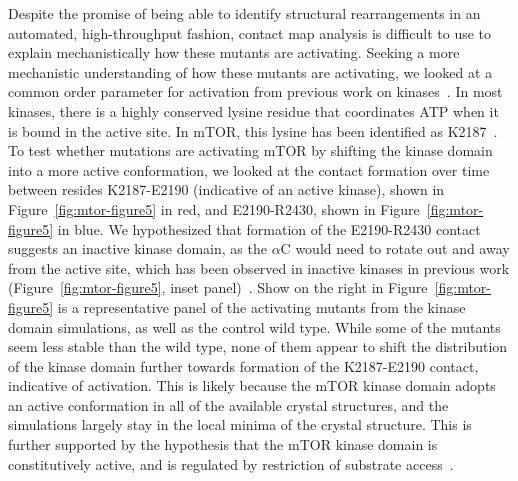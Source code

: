 \documentclass[phd,tocprelim]{cornell}
\begin{document}
Despite the promise of being able to identify structural rearrangements in an automated, high-throughput fashion, contact map analysis is difficult to use to explain mechanistically how these mutants are activating. Seeking a more mechanistic understanding of how these mutants are activating, we looked at a common order parameter for activation from previous work on kinases~\citep{Shukla:2014jp}. In most kinases, there is a highly conserved lysine residue that coordinates ATP when it is bound in the active site. In mTOR, this lysine has been identified as K2187~\citep{Yang:2013gaa}. To test whether mutations are activating mTOR by shifting the kinase domain into a more active conformation, we looked at the contact formation over time between resides K2187-E2190 (indicative of an active kinase), shown in Figure~\ref{fig:mtor-figure5} in red, and E2190-R2430, shown in Figure~\ref{fig:mtor-figure5} in blue. We hypothesized that formation of the E2190-R2430 contact suggests an inactive kinase domain, as the $\alpha$C would need to rotate out and away from the active site, which has been observed in inactive kinases in previous work (Figure~\ref{fig:mtor-figure5}, inset panel)~\citep{Shukla:2014jp,Jura:2011eh}. Show on the right in Figure~\ref{fig:mtor-figure5} is a representative panel of the activating mutants from the kinase domain simulations, as well as the control wild type. While some of the mutants seem less stable than the wild type, none of them appear to shift the distribution of the kinase domain further towards formation of the K2187-E2190 contact, indicative of activation. This is likely because the mTOR kinase domain adopts an active conformation in all of the available crystal structures, and the simulations largely stay in the local minima of the crystal structure. This is further supported by the hypothesis that the mTOR kinase domain is constitutively active, and is regulated by restriction of substrate access~\citep{Yang:2013gaa,Laplante:2012fm,Saxton:2017cv}. 
\end{document}
